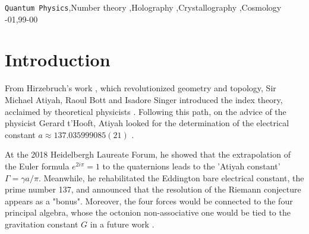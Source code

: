 \documentclass[preprint,12pt]{elsarticle}
\begin{document}
\begin{frontmatter}
\begin{keyword}
\texttt{Quantum Physics}\sep Number theory \sep Holography \sep Crystallography \sep Cosmology
-01\sep  99-00
\end{keyword}


\end{frontmatter}


\section{Introduction}
  
    From Hirzebruch's work \cite{Hirzebruch}, which revolutionized geometry and topology, Sir Michael Atiyah, Raoul Bott \cite{Bott} and Isadore Singer \cite{Singer} introduced the index theory, acclaimed by theoretical physicists \cite{Alvarez}. Following this path, on the advice of the physicist Gerard t'Hooft, Atiyah looked for the determination of the electrical constant $a \approx 137.035999085(21)$ \cite{Atiyah}.
    
    
    At the 2018 Heidelbergh Laureate Forum, he showed that the extrapolation of the Euler formula  $e^{2i\pi} = 1$ to the quaternions leads to the 'Atiyah constant' $\Gamma = \gamma a/\pi $. Meanwhile, he rehabilitated the Eddington \cite{Eddington} bare electrical constant, the prime number 137, and announced that the resolution of the Riemann conjecture appears as a "bonus". Moreover, the four forces would be connected to the four principal algebra, whose the octonion non-associative one would be tied to the gravitation constant $G$ in a future work \cite{Atiyah}. 

\label{}





\end{document}
